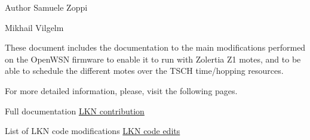 \begin{DoxyAuthor}{Author}
Samuele Zoppi 

Mikhail Vilgelm
\end{DoxyAuthor}
These document includes the documentation to the main modifications performed on the Open\+W\+SN firmware to enable it to run with Zolertia Z1 motes, and to be able to schedule the different motes over the T\+S\+CH time/hopping resources.

For more detailed information, please, visit the following pages.
\begin{DoxyItemize}
\item Full documentation \hyperlink{_l_k_n_contribution}{L\+KN contribution}
\item List of L\+KN code modifications \hyperlink{_l_k_n_code_edits}{L\+KN code edits} 
\end{DoxyItemize}